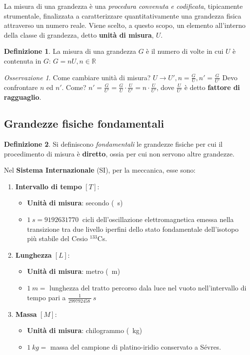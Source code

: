 \documentclass[a4paper, 12pt]{report}
\theoremstyle{definition}
\newtheorem{definition}{Definizione}[chapter]
\theoremstyle{remark}
\newtheorem{remark}{Osservazione}[definition]
\theoremstyle{plain}
\newcommand{\R}{\mathbb{R}}
\begin{document}
La misura di una grandezza è una {\it procedura convenuta e codificata}, tipicamente strumentale, finalizzata a caratterizzare quantitativamente una grandezza fisica attraverso un numero reale.
Viene scelto, a questo scopo, un elemento all'interno della classe di grandezza, detto {\bf unità di misura}, $U$.

\begin{definition}
    La misura di una grandezza $G$ è il numero di volte in cui $U$ è contenuta in $G$: $G = nU, n \in \R$
\end{definition}

\begin{remark}
    Come cambiare unità di misura?
    $U \rightarrow U', n = \frac{G}{U}, n' = \frac{G}{U'}$
    Devo confrontare $n$ ed $n'$. Come?
    $n' = \frac{G}{U'} = \frac{G}{U} \cdot \frac{U}{U'} = n \cdot \frac{U}{U'}$, dove $\frac{U}{U'}$ è detto {\bf fattore di ragguaglio}.
\end{remark}

\subsection{Grandezze fisiche fondamentali}

\begin{definition}
    Si definiscono {\it fondamentali} le grandezze fisiche per cui il procedimento di misura è {\bf diretto}, ossia per cui non servono altre grandezze.
\end{definition}

Nel {\bf Sistema Internazionale} (SI), per la meccanica, esse sono:
\begin{enumerate}
    \item {\bf Intervallo di tempo} $[T]$:
        \begin{itemize}
            \item {\bf Unità di misura}: secondo (\SI{}{s})
            \item $\SI{1}{s} = \SI{9192631770}{}$ cicli dell'oscillazione elettromagnetica emessa nella transizione tra due livello iperfini dello stato fondamentale dell'isotopo più stabile del Cesio ${}^{133}$Cs.
        \end{itemize}
    \item {\bf Lunghezza} $[L]$:
        \begin{itemize}
            \item {\bf Unità di misura}: metro (\SI{}{m})
            \item $\SI{1}{m} = $ lunghezza del tratto percorso dala luce nel vuoto nell'intervallo di tempo pari a $\frac{1}{\SI{299792458}{}}\SI{}{s}$
        \end{itemize}
    \item {\bf Massa} $[M]$:
    \begin{itemize}
        \item {\bf Unità di misura}: chilogrammo (\SI{}{kg})
        \item $\SI{1}{kg} = $ massa del campione di platino-iridio conservato a Sévres.
    \end{itemize}
\end{enumerate}
\end{document}
